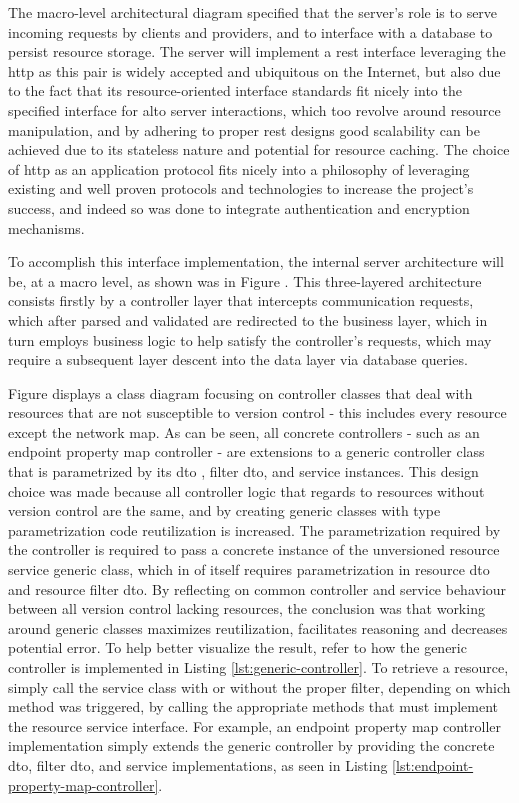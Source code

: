     The macro-level architectural diagram specified that the server's role is to serve incoming requests by clients and providers, and to interface with a database to persist resource storage.
    The server will implement a \gls{rest} interface leveraging the \gls{http} as this pair is widely accepted and ubiquitous on the Internet, but also due to the fact that its resource-oriented interface standards fit nicely into the specified interface for \gls{alto} server interactions, which too revolve around resource manipulation, and by adhering to proper \gls{rest} designs good scalability can be achieved due to its stateless nature and potential for resource caching.
    The choice of \gls{http} as an application protocol fits nicely into a philosophy of leveraging existing and well proven protocols and technologies to increase the project's success, and indeed so was done to integrate authentication and encryption mechanisms.

    To accomplish this interface implementation, the internal server architecture will be, at a macro level, as shown was in Figure \cite{fig:alto-server-architecture-macro}.
    This three-layered architecture consists firstly by a controller layer that intercepts communication requests, which after parsed and validated are redirected to the business layer, which in turn employs business logic to help satisfy the controller's requests, which may require a subsequent layer descent into the data layer via database queries.

    Figure \cite{fig:controller-unversioned-architecture} displays a class diagram focusing on controller classes that deal with resources that are not susceptible to version control - this includes every resource except the network map.
    As can be seen, all concrete controllers - such as an endpoint property map controller - are extensions to a generic controller class that is parametrized by its \gls{dto} , filter \gls{dto}, and service instances.
    This design choice was made because all controller logic that regards to resources without version control are the same, and by creating generic classes with type parametrization code reutilization is increased.
    The parametrization required by the controller is required to pass a concrete instance of the unversioned resource service generic class, which in of itself requires parametrization in resource \gls{dto} and resource filter \gls{dto}.
    By reflecting on common controller and service behaviour between all version control lacking resources, the conclusion was that working around generic classes maximizes reutilization, facilitates reasoning and decreases potential error.
    To help better visualize the result, refer to how the generic controller is implemented in Listing \ref{lst:generic-controller}.
    To retrieve a resource, simply call the service class with or without the proper filter, depending on which method was triggered, by calling the appropriate methods that must implement the resource service interface.
    For example, an endpoint property map controller implementation simply extends the generic controller by providing the concrete \gls{dto}, filter \gls{dto}, and service implementations, as seen in Listing \ref{lst:endpoint-property-map-controller}.

